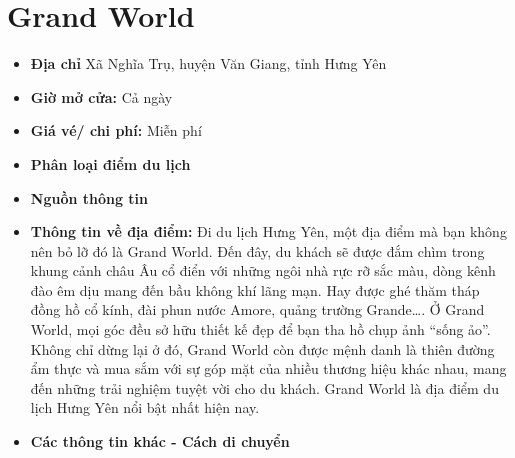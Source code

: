 \documentclass{article}
\begin{document}
\section{Grand World}
\begin{itemize}
    \item{\textbf{Địa chỉ}} Xã Nghĩa Trụ, huyện Văn Giang, tỉnh Hưng Yên

    \item{\textbf{Giờ mở cửa:}} Cả ngày

    \item{\textbf{Giá vé/ chi phí:}} Miễn phí

    \item{\textbf{Phân loại điểm du lịch}} 

    \item{\textbf{Nguồn thông tin}} 

    \item{\textbf{Thông tin về địa điểm:}} Đi du lịch Hưng Yên, một địa điểm mà bạn không nên bỏ lỡ đó là Grand World. Đến đây, du khách sẽ được đắm chìm trong khung cảnh châu Âu cổ điển với những ngôi nhà rực rỡ sắc màu, dòng kênh đào êm dịu mang đến bầu không khí lãng mạn. Hay được ghé thăm tháp đồng hồ cổ kính, đài phun nước Amore, quảng trường Grande…. Ở Grand World, mọi góc đều sở hữu thiết kế đẹp để bạn tha hồ chụp ảnh “sống ảo”. Không chỉ dừng lại ở đó, Grand World còn được mệnh danh là thiên đường ẩm thực và mua sắm với sự góp mặt của nhiều thương hiệu khác nhau, mang đến những trải nghiệm tuyệt vời cho du khách. Grand World là địa điểm du lịch Hưng Yên nổi bật nhất hiện nay.
\end{itemize}

\begin{itemize}
    \item{\textbf{Các thông tin khác - Cách di chuyển}} 
\end{itemize}
\end{document}
